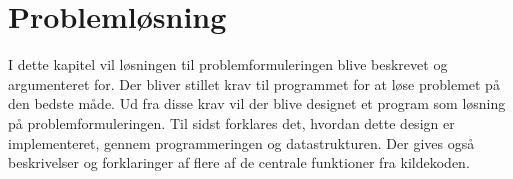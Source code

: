 \chapter{Problemløsning}\label{ch:chlabel}
I dette kapitel vil løsningen til problemformuleringen blive beskrevet og argumenteret for. Der bliver stillet krav til programmet for at løse problemet på den bedste måde. Ud fra disse krav vil der blive designet et program som løsning på problemformuleringen. Til sidst forklares det, hvordan dette design er implementeret, gennem programmeringen og datastrukturen. Der gives også beskrivelser og forklaringer af flere af de centrale funktioner fra kildekoden. 


